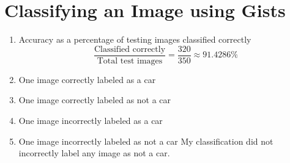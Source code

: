 \documentclass{article}
\begin{document}
\newpage

\section{Classifying an Image using Gists}
\begin{enumerate}
\item Accuracy as a percentage of testing images classified correctly
\newline
$$ \frac{\text{Classified correctly}}{\text{Total test images}} = \frac{320}{350} \approx 91.4286\%  $$

\item One image correctly labeled as a car
\begin{figure}[h!]
\end{figure}

\item One image correctly labeled as not a car
\begin{figure}[h!]
\end{figure}

\item One image incorrectly labeled as a car
\begin{figure}[h!]
\end{figure}

\item One image incorrectly labeled as not a car
\newline
My classification did not incorrectly label any image as not a car.
\end{enumerate}
\end{document}

